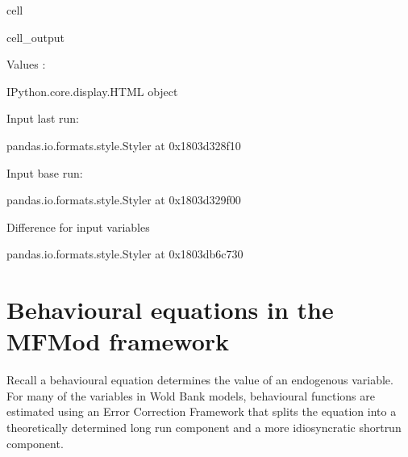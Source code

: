 \documentclass[letterpaper,10pt,english]{jupyterBook}
\begin{document}
\begin{sphinxuseclass}{cell}
\begin{sphinxVerbatimOutput}
\begin{sphinxuseclass}{cell_output}
\begin{sphinxVerbatim}[commandchars=\\\{\}]
Values :
\end{sphinxVerbatim}

\begin{sphinxVerbatim}[commandchars=\\\{\}]
\PYGZlt{}IPython.core.display.HTML object\PYGZgt{}
\end{sphinxVerbatim}

\begin{sphinxVerbatim}[commandchars=\\\{\}]
Input last run:
\end{sphinxVerbatim}

\begin{sphinxVerbatim}[commandchars=\\\{\}]
\PYGZlt{}pandas.io.formats.style.Styler at 0x1803d328f10\PYGZgt{}
\end{sphinxVerbatim}

\begin{sphinxVerbatim}[commandchars=\\\{\}]
Input base run:
\end{sphinxVerbatim}

\begin{sphinxVerbatim}[commandchars=\\\{\}]
\PYGZlt{}pandas.io.formats.style.Styler at 0x1803d329f00\PYGZgt{}
\end{sphinxVerbatim}

\begin{sphinxVerbatim}[commandchars=\\\{\}]
Difference for input variables
\end{sphinxVerbatim}

\begin{sphinxVerbatim}[commandchars=\\\{\}]
\PYGZlt{}pandas.io.formats.style.Styler at 0x1803db6c730\PYGZgt{}
\end{sphinxVerbatim}

\begin{sphinxVerbatim}[commandchars=\\\{\}]

\end{sphinxVerbatim}

\end{sphinxuseclass}\end{sphinxVerbatimOutput}

\end{sphinxuseclass}

\section{Behavioural equations in the MFMod framework}
\label{\detokenize{content/05_WBModels/LoadingWBModel:behavioural-equations-in-the-mfmod-framework}}
\sphinxAtStartPar
Recall a behavioural equation determines the value of an endogenous variable. For many of the variables in Wold Bank models, behavioural functions are estimated using an Error Correction Framework that splits the equation into a theoretically determined long run component and a more idiosyncratic short\sphinxhyphen{}run component.
\end{document}
